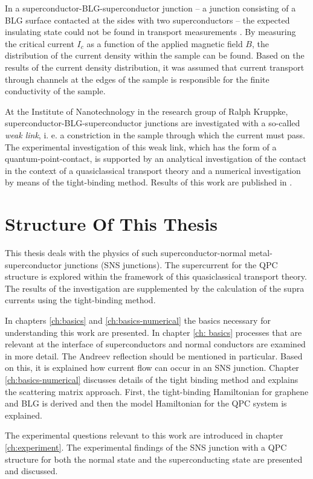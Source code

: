 In a superconductor-BLG-superconductor junction -- a junction consisting of a BLG surface contacted at the sides with two superconductors -- the expected insulating state could not be found in transport measurements \cite{Zhu2017}. By measuring the critical current $I_c$ as a function of the applied magnetic field $B$, the distribution of the current density within the sample can be found. Based on the results of the current density distribution, it was assumed that current transport through channels at the edges of the sample is responsible for the finite conductivity of the sample. 

At the Institute of Nanotechnology in the research group of Ralph Kruppke, superconductor-BLG-superconductor junctions are investigated with a so-called \emph{weak link}, i. e. a constriction in the sample through which the current must pass. The experimental investigation of this weak link, which has the form of a quantum-point-contact, is supported by an analytical investigation of the contact in the context of a quasiclassical transport theory and a numerical investigation by means of the tight-binding method. Results of this work are published in \cite{Craft2017}. 

\section*{Structure Of This Thesis}

This thesis deals with the physics of such superconductor-normal metal-superconductor junctions (SNS junctions). The supercurrent for the QPC structure is explored within the framework of this quasiclassical transport theory. The results of the investigation are supplemented by the calculation of the supra currents using the tight-binding method.

In chapters \ref{ch:basics} and \ref{ch:basics-numerical} the basics necessary for understanding this work are presented. In chapter \ref{ch: basics} processes that are relevant at the interface of superconductors and normal conductors are examined in more detail. The Andreev reflection should be mentioned in particular. Based on this, it is explained how current flow can occur in an SNS junction. Chapter \ref{ch:basics-numerical} discusses details of the tight binding method and explains the scattering matrix approach. First, the tight-binding Hamiltonian for graphene and BLG is derived and then the model Hamiltonian for the QPC system is explained. 

The experimental questions relevant to this work are introduced in chapter \ref{ch:experiment}. The experimental findings of the SNS junction with a QPC structure for both the normal state and the superconducting state are presented and discussed.

